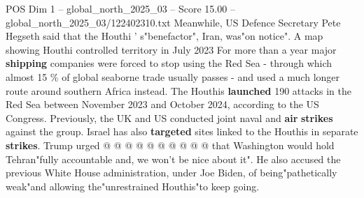 \begin{textsample}{POS Dim 1 – global\_north\_2025\_03 – Score 15.00 – global\_north\_2025\_03/122402310.txt}
Meanwhile, US Defence Secretary Pete Hegseth said that the Houthi ' s"benefactor", Iran, was"on notice".
A map showing Houthi controlled territory in July 2023 For more than a year major \textbf{shipping} companies were forced to stop using the Red Sea - through which almost 15 \% of global seaborne trade usually passes - and used a much longer route around southern Africa instead.
The Houthis \textbf{launched} 190 attacks in the Red Sea between November 2023 and October 2024, according to the US Congress.
Previously, the UK and US conducted joint naval and \textbf{air} \textbf{strikes} against the group.
Israel has also \textbf{targeted} sites linked to the Houthis in separate \textbf{strikes}.
Trump urged @ @ @ @ @ @ @ @ @ @ that Washington would hold Tehran"fully accountable and, we won't be nice about it".
He also accused the previous White House administration, under Joe Biden, of being"pathetically weak"and allowing the"unrestrained Houthis"to keep going.

\end{textsample}
